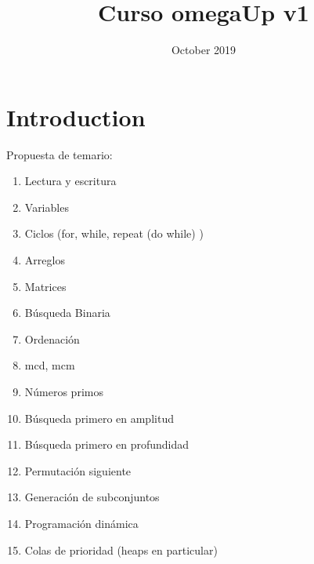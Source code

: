 \documentclass{article}
\title{Curso omegaUp v1}
\author{ }
\date{October 2019}
\begin{document}
\maketitle

\section{Introduction}
Propuesta de temario:

\begin{enumerate}
\item Lectura y escritura
\item Variables
\item Ciclos (for, while, repeat (do while) )
\item Arreglos
\item Matrices
\item Búsqueda Binaria
\item Ordenación
\item mcd, mcm
\item Números primos
\item Búsqueda primero en amplitud
\item Búsqueda primero en profundidad
\item Permutación siguiente
\item Generación de subconjuntos
\item Programación dinámica
\item Colas de prioridad (heaps en particular)
\end{enumerate}
\end{document}
